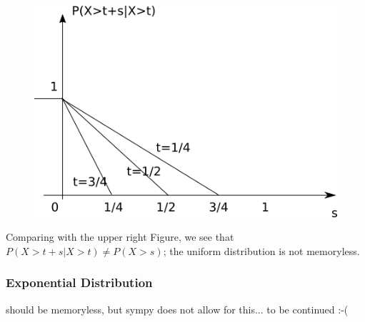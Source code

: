 \begin{figure}[H]
\includegraphics[scale=0.7]{images/memory_less_2.png}
\end{figure}

Comparing with the upper right Figure, we see that $P(X>t+s | X>t)
\neq P(X>s)$; the uniform distribution is not memoryless.

\subsubsection{Exponential Distribution}

should be memoryless, but sympy does not allow for this... to be
continued :-(
